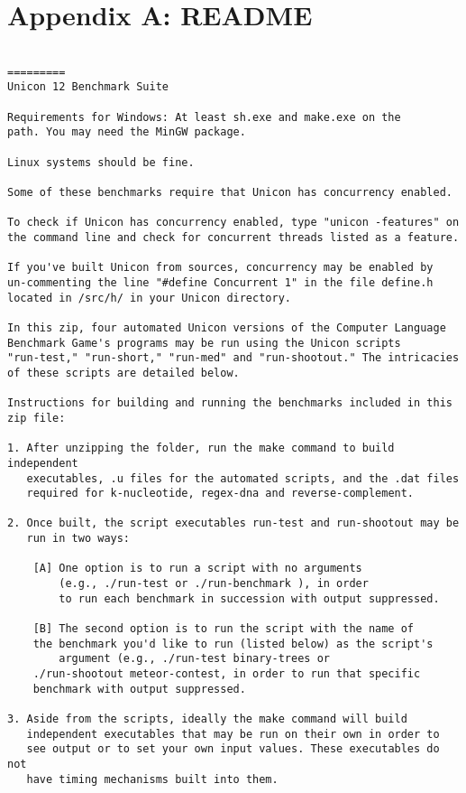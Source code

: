 \documentclass[letterpaper,12pt]{article}
\begin{document}

 

\section*{Appendix A: README}
\begin{adjustwidth}{-.5cm}{-.5cm}
\begin{verbatim}

=========
Unicon 12 Benchmark Suite 

Requirements for Windows: At least sh.exe and make.exe on the
path. You may need the MinGW package.

Linux systems should be fine.

Some of these benchmarks require that Unicon has concurrency enabled. 

To check if Unicon has concurrency enabled, type "unicon -features" on
the command line and check for concurrent threads listed as a feature.

If you've built Unicon from sources, concurrency may be enabled by
un-commenting the line "#define Concurrent 1" in the file define.h
located in /src/h/ in your Unicon directory. 

In this zip, four automated Unicon versions of the Computer Language
Benchmark Game's programs may be run using the Unicon scripts
"run-test," "run-short," "run-med" and "run-shootout." The intricacies
of these scripts are detailed below.

Instructions for building and running the benchmarks included in this
zip file:

1. After unzipping the folder, run the make command to build independent
   executables, .u files for the automated scripts, and the .dat files
   required for k-nucleotide, regex-dna and reverse-complement. 
  
2. Once built, the script executables run-test and run-shootout may be
   run in two ways:
   
	[A] One option is to run a script with no arguments 
	    (e.g., ./run-test or ./run-benchmark ), in order 
	    to run each benchmark in succession with output suppressed.

	[B] The second option is to run the script with the name of
   	the benchmark you'd like to run (listed below) as the script's 
	    argument (e.g., ./run-test binary-trees or 
    ./run-shootout meteor-contest, in order to run that specific 
    benchmark with output suppressed.

3. Aside from the scripts, ideally the make command will build
   independent executables that may be run on their own in order to
   see output or to set your own input values. These executables do not
   have timing mechanisms built into them.   


\end{verbatim}
\end{adjustwidth}
\end{document}
